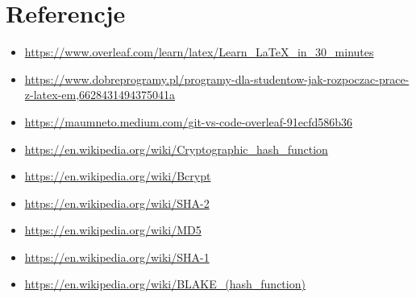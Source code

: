 \documentclass{article}
\begin{document}
\section{Referencje}
\begin{itemize}
    \item \url{https://www.overleaf.com/learn/latex/Learn_LaTeX_in_30_minutes}
    \item \url{https://www.dobreprogramy.pl/programy-dla-studentow-jak-rozpoczac-prace-z-latex-em,6628431494375041a}
    \item \url{https://maumneto.medium.com/git-vs-code-overleaf-91ecfd586b36}
    \item \url{https://en.wikipedia.org/wiki/Cryptographic_hash_function}
    \item \url{https://en.wikipedia.org/wiki/Bcrypt}
    \item \url{https://en.wikipedia.org/wiki/SHA-2}
    \item \url{https://en.wikipedia.org/wiki/MD5}
    \item \url{https://en.wikipedia.org/wiki/SHA-1}
    \item \url{https://en.wikipedia.org/wiki/BLAKE_(hash_function)}
\end{itemize}
\end{document}
